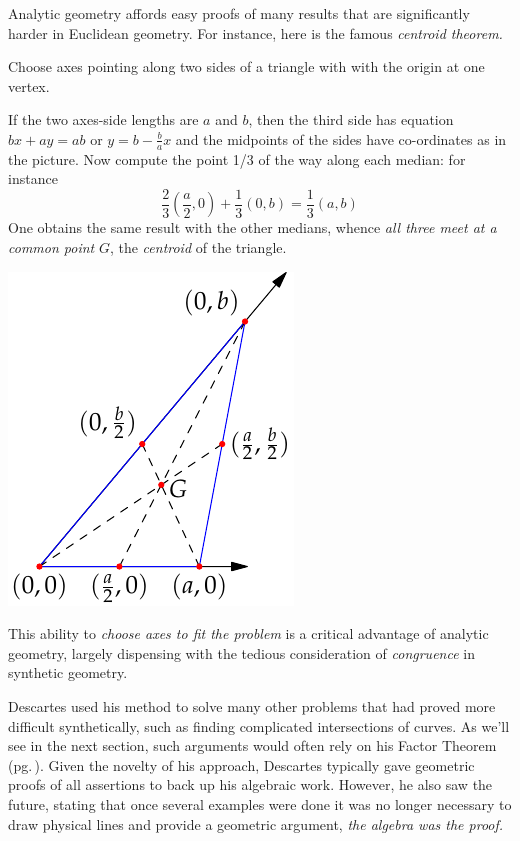  Analytic geometry affords easy proofs of many results that are significantly harder in Euclidean geometry. For instance, here is the famous \emph{centroid theorem.}
\par
\begin{minipage}[t]{0.68\linewidth}\vspace{-5pt}
	Choose axes pointing along two sides of a triangle with with the origin at one vertex.
	\par
	If the two axes-side lengths are $a$ and $b$, then the third side has equation $bx+ay=ab$ or $y=b-\frac bax$ and the midpoints of the sides have co-ordinates as in the picture. Now compute the point 1/3 of the way along each median: for instance
	\[\frac 23\left(\frac a2,0\right)+\frac 13(0,b)=\frac 13(a,b)\]
	One obtains the same result with the other medians, whence \emph{all three meet at a common point} $G$, the \emph{centroid} of the triangle.
\end{minipage}\hfill\begin{minipage}[t]{0.3\linewidth}\vspace{-15pt}
	\flushright\includegraphics[scale=1]{analytic-centroid}
\end{minipage}
\medbreak


This ability to \emph{choose axes to fit the problem} is a critical advantage of analytic geometry, largely dispensing with the tedious consideration of \emph{congruence} in synthetic geometry.

\smallbreak

Descartes used his method to solve many other problems that had proved more difficult synthetically, such as finding complicated intersections of curves. As we'll see in the next section, such arguments would often rely on his Factor Theorem (pg.\,\pageref{pg:factorthm}). Given the novelty of his approach, Descartes typically gave geometric proofs of all assertions to back up his algebraic work. However, he also saw the future, stating that once several examples were done it was no longer necessary to draw physical lines and provide a geometric argument, \emph{the algebra was the proof.}





